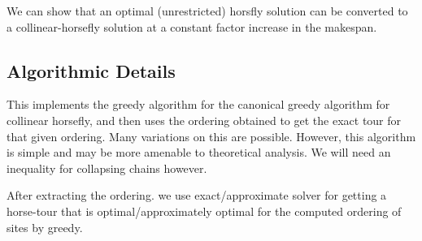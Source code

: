 \documentclass[11.5pt]{report}
\begin{document}
We can show that an optimal (unrestricted) horsfly solution can be converted
to a collinear-horsefly solution at a constant factor increase in the makespan. 

\subsection{Algorithmic Details}

\newchunk  
This implements the greedy algorithm for the canonical greedy
algorithm for collinear horsefly, and then uses the ordering 
obtained to get the exact tour for that given ordering.
Many variations on this are possible. However, this algorithm
is simple and may be more amenable to theoretical analysis. 
We will need an inequality for collapsing chains however. 

After extracting the ordering. we use exact/approximate solver for 
getting a horse-tour that is optimal/approximately optimal for the 
computed ordering of sites by greedy.
\end{document}
